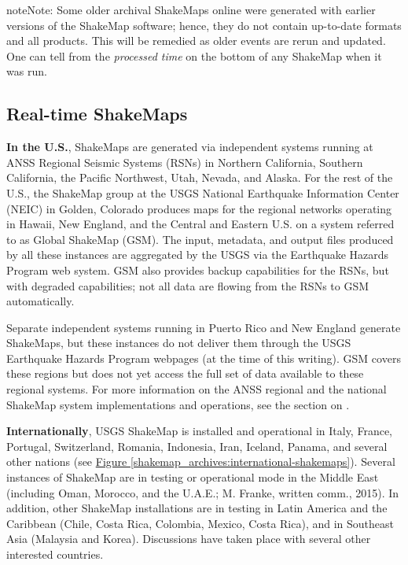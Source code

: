 \documentclass[letterpaper,10pt,english]{sphinxmanual}
\begin{document}
\begin{notice}{note}{Note:}
Some older archival ShakeMaps
online were generated with earlier versions of the ShakeMap
software; hence, they do not contain up-to-date formats and all
products. This will be remedied as older events are rerun and
updated. One can tell from the \emph{processed time} on the bottom of
any ShakeMap when it was run.
\end{notice}


\subsection{Real-time ShakeMaps}
\label{shakemap_archives:real-time-shakemaps}
\textbf{In the U.S.}, ShakeMaps are generated via independent systems running at ANSS
Regional Seismic Systems (RSNs) in Northern California, Southern California, the
Pacific Northwest, Utah, Nevada, and Alaska. For the rest of the U.S., the
ShakeMap group at the USGS National Earthquake Information Center (NEIC) in Golden, Colorado
produces maps for the regional networks operating in Hawaii, New England, and
the Central and Eastern U.S. on a system referred to as Global ShakeMap (GSM).
The input, metadata, and output files produced by all these instances are
aggregated by the USGS via the Earthquake Hazards Program web system. GSM also provides
backup capabilities for the RSNs, but with degraded capabilities; not all data
are flowing from the RSNs to GSM automatically.

Separate independent systems running in Puerto Rico and New England generate
ShakeMaps, but these instances do not deliver them through the USGS Earthquake Hazards
Program webpages (at the time of this writing). GSM covers these regions but
does not yet access the full set of data available to these regional
systems. For more information on the ANSS regional and the national
ShakeMap system implementations and operations, see the section on {\hyperref[regionals:sec\string-regionals]{}}.

\textbf{Internationally}, USGS ShakeMap is installed and operational in Italy,
France, Portugal, Switzerland, Romania, Indonesia, Iran, Iceland,
Panama, and several other nations (see \hyperref[shakemap_archives:international-shakemaps]{Figure  \ref*{shakemap_archives:international-shakemaps}}).
Several instances of ShakeMap are in testing
or operational mode in the Middle East (including Oman, Morocco, and the U.A.E.; M.
Franke, written comm., 2015). In addition, other ShakeMap installations are in
testing in Latin America and the Caribbean (Chile, Costa Rica, Colombia, Mexico,
Costa Rica), and in Southeast Asia (Malaysia and Korea). Discussions have taken
place with several other interested countries.
\end{document}
